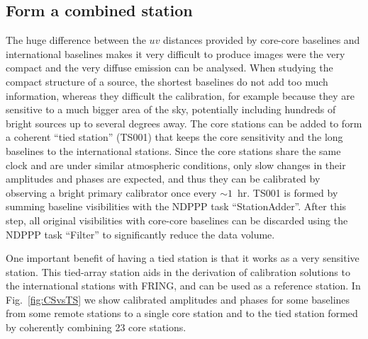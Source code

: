 \documentclass[graybox]{svmult}
\begin{document}
\subsection{Form a combined station}

The huge difference between the $uv$ distances provided by core-core baselines
and international baselines makes it very difficult to produce images were the
very compact and the very diffuse emission can be analysed. When studying the
compact structure of a source, the shortest baselines do not add too much
information, whereas they difficult the calibration, for example because they
are sensitive to a much bigger area of the sky, potentially including hundreds
of bright sources up to several degrees away. The core stations can be added to
form a coherent ``tied station'' (TS001) that keeps the core sensitivity and
the long baselines to the international stations. Since the core stations share
the same clock and are under similar atmospheric conditions, only slow changes
in their amplitudes and phases are expected, and thus they can be calibrated by
observing a bright primary calibrator once every $\sim1$~hr. TS001 is formed by
summing baseline visibilities with the NDPPP task ``StationAdder''.  After this
step, all original visibilities with core-core baselines can be discarded using
the NDPPP task ``Filter'' to significantly reduce the data volume.

One important benefit of having a tied station is that it works as a very
sensitive station. This tied-array station aids in the derivation of
calibration solutions to the international stations with FRING, and can be used
as a reference station. In Fig.~\ref{fig:CSvsTS} we show calibrated amplitudes
and phases for some baselines from some remote stations to a single core
station and to the tied station formed by coherently combining 23 core stations.
\end{document}
